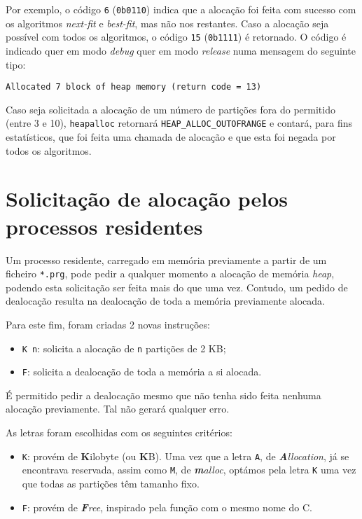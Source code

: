 \documentclass[10pt,oneside]{estiloUBI}
\begin{document}
	Por exemplo, o código \verb|6| (\verb|0b0110|) indica que a alocação foi feita com sucesso com os algoritmos \textit{next-fit} e \textit{best-fit}, mas não nos restantes. Caso a alocação seja possível com todos os algoritmos, o código \verb|15| (\verb|0b1111|) é retornado. O código é indicado quer em modo \textit{debug} quer em modo \textit{release} numa mensagem do seguinte tipo:
	
	\begin{verbatim}
Allocated 7 block of heap memory (return code = 13)
	\end{verbatim}
	
	Caso seja solicitada a alocação de um número de partições fora do permitido (entre 3 e 10), \verb|heapalloc| retornará \verb|HEAP_ALLOC_OUTOFRANGE| e contará, para fins estatísticos, que foi feita uma chamada de alocação e que esta foi negada por todos os algoritmos.
	
	
	
	\section{Solicitação de alocação pelos processos residentes}
	\label{ssec:heap:alloc}
	
	Um processo residente, carregado em memória previamente a partir de um ficheiro \verb|*.prg|, pode pedir a qualquer momento a alocação de memória \textit{heap}, podendo esta solicitação ser feita mais do que uma vez. Contudo, um pedido de dealocação resulta na dealocação de toda a memória previamente alocada.
	
	Para este fim, foram criadas 2 novas instruções:
	
	\begin{itemize}
		\item \verb|K n|: solicita a alocação de \verb|n| partições de 2 KB;
		\item \verb|F|: solicita a dealocação de toda a memória a si alocada.
	\end{itemize}

	É permitido pedir a dealocação mesmo que não tenha sido feita nenhuma alocação previamente. Tal não gerará qualquer erro.
	
	As letras foram escolhidas com os seguintes critérios:
	
	\begin{itemize}
		\item \verb|K|: provém de \textbf{K}ilobyte (ou \textbf{K}B). Uma vez que a letra \verb|A|, de \textit{\textbf{A}llocation}, já se encontrava reservada, assim como \verb|M|, de \textit{\textbf{m}alloc}, optámos pela letra \verb|K| uma vez que todas as partições têm tamanho fixo.
		
		\item \verb|F|: provém de \textit{\textbf{F}ree}, inspirado pela função com o mesmo nome do C.
	\end{itemize}
\end{document}
